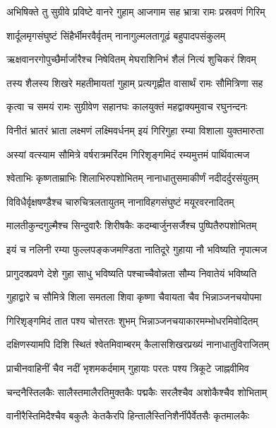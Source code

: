 
\twolineshloka
{अभिषिक्ते तु सुग्रीवे प्रविष्टे वानरे गुहाम्}
{आजगाम सह भ्रात्रा रामः प्रस्रवणं गिरिम्} %

\twolineshloka
{शार्दूलमृगसंघुष्टं सिंहैर्भीमरवैर्वृतम्}
{नानागुल्मलतागूढं बहुपादपसंकुलम्} %

\twolineshloka
{ऋक्षवानरगोपुच्छैर्मार्जारैश्च निषेवितम्}
{मेघराशिनिभं शैलं नित्यं शुचिकरं शिवम्} %

\twolineshloka
{तस्य शैलस्य शिखरे महतीमायतां गुहाम्}
{प्रत्यगृह्णीत वासार्थं रामः सौमित्रिणा सह} %

\twolineshloka
{कृत्वा च समयं रामः सुग्रीवेण सहानघः}
{कालयुक्तं महद्वाक्यमुवाच रघुनन्दनः} %

\twolineshloka
{विनीतं भ्रातरं भ्राता लक्ष्मणं लक्ष्मिवर्धनम्}
{इयं गिरिगुहा रम्या विशाला युक्तमारुता} %

\twolineshloka
{अस्यां वत्स्याम सौमित्रे वर्षरात्रमरिंदम}
{गिरिशृङ्गमिदं रम्यमुत्तमं पार्थिवात्मज} %

\twolineshloka
{श्वेताभिः कृष्णताम्राभिः शिलाभिरुपशोभितम्}
{नानाधातुसमाकीर्णं नदीदर्दुरसंयुतम्} %

\twolineshloka
{विविधैर्वृक्षषण्डैश्च चारुचित्रलतायुतम्}
{नानाविहगसंघुष्टं मयूरवरनादितम्} %

\twolineshloka
{मालतीकुन्दगुल्मैश्च सिन्दुवारैः शिरीषकैः}
{कदम्बार्जुनसर्जैश्च पुष्पितैरुपशोभितम्} %

\twolineshloka
{इयं च नलिनी रम्या फुल्लपङ्कजमण्डिता}
{नातिदूरे गुहाया नौ भविष्यति नृपात्मज} %

\twolineshloka
{प्रागुदक्प्रवणे देशे गुहा साधु भविष्यति}
{पश्चाच्चैवोन्नता सौम्य निवातेयं भविष्यति} %

\twolineshloka
{गुहाद्वारे च सौमित्रे शिला समतला शिवा}
{कृष्णा चैवायता चैव भिन्नाञ्जनचयोपमा} %

\twolineshloka
{गिरिशृङ्गमिदं तात पश्य चोत्तरतः शुभम्}
{भिन्नाञ्जनचयाकारमम्भोधरमिवोदितम्} %

\twolineshloka
{दक्षिणस्यामपि दिशि स्थितं श्वेतमिवाम्बरम्}
{कैलासशिखरप्रख्यं नानाधातुविराजितम्} %

\twolineshloka
{प्राचीनवाहिनीं चैव नदीं भृशमकर्दमाम्}
{गुहायाः परतः पश्य त्रिकूटे जाह्नवीमिव} %

\twolineshloka
{चन्दनैस्तिलकैः सालैस्तमालैरतिमुक्तकैः}
{पद्मकैः सरलैश्चैव अशोकैश्चैव शोभिताम्} %

\twolineshloka
{वानीरैस्तिमिदैश्चैव बकुलैः केतकैरपि}
{हिन्तालैस्तिनिशैर्नीपैर्वेतसैः कृतमालकैः} %

